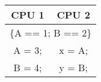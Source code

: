 \centering
\small
\renewcommand{\arraystretch}{1.5}
\begin{tabular}{|c|c|}
        \hline \textbf{CPU 1}& \textbf{CPU 2}\\[5pt]
	\hline \multicolumn{2}{|c|}{ \{A == 1; B == 2\} }\\ 
        \hline A = 3; & x = A;\\
        \hline B = 4; & y = B;\\
        \hline
\end{tabular}
